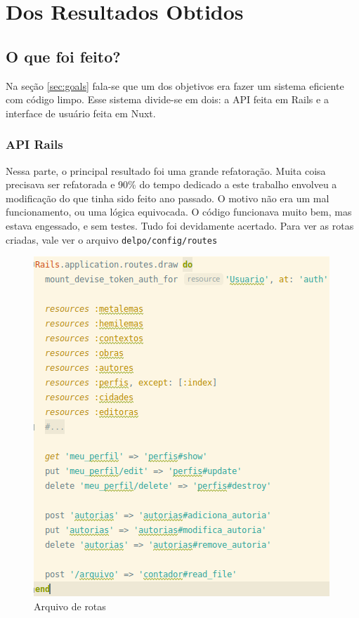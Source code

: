 
\chapter{Dos Resultados Obtidos}
\label{cap:results}
\minitoc


\section{O que foi feito?}
\label{sec:to-be-done}

Na seção \ref{sec:goals} fala-se que um dos objetivos era fazer um sistema eficiente com código limpo.
Esse sistema divide-se em dois: a API feita em Rails e a interface de usuário feita em Nuxt.

\subsection{API Rails}\label{subsec:api-rails}

Nessa parte, o principal resultado foi uma grande refatoração. Muita coisa precisava ser refatorada e 90\% do
tempo dedicado a este trabalho envolveu a modificação do que tinha sido feito ano passado. O motivo não era um
mal funcionamento, ou uma lógica equivocada. O código funcionava muito bem, mas estava engessado, e sem testes.
Tudo foi devidamente acertado. Para ver as rotas criadas, vale ver o arquivo \texttt{delpo/config/routes}

\begin{figure}[h]
  \centering
  \includegraphics[width=.6\textwidth]{figuras/rails_routes.png}
  \caption{Arquivo de rotas}
  \label{fig:routes_files}
\end{figure}

